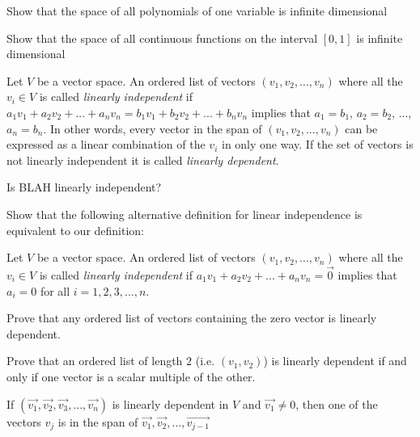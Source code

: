 \begin{Basis and Dimension}
 \begin{question}
 	Show that the space of all polynomials of one variable is infinite dimensional
 \end{question}
 
 \begin{question}
 	Show that the space of all continuous functions on the interval $[0,1]$ is infinite dimensional
 \end{question}
 
 \begin{definition}
 	Let $V$ be a vector space. An ordered list of vectors $(v_1,v_2,...,v_n)$ where all the $v_i \in V$ is called \textit{linearly independent} if
 	$a_1v_1+a_2v_2 + ...+a_nv_n = b_1v_1 + b_2v_2 + ... + b_nv_n$ implies that $a_1  = b_1$, $a_2 = b_2$, ...,$a_n=b_n$.  In other words,
 	every vector in the span of $(v_1,v_2,...,v_n)$ can be expressed as a linear combination of the $v_i$ in only one way.  
 	If the set of vectors is not linearly independent it is called \textit{linearly dependent}.
 \end{definition}
 
 \begin{question}
 	Is BLAH linearly independent?
 \end{question}
 
 \begin{question}
 	Show that the following alternative definition for linear independence is equivalent to our definition:
 	
 	\begin{definition}
 		Let $V$ be a vector space. An ordered list of vectors $(v_1,v_2,...,v_n)$ where all the $v_i \in V$ is called \textit{linearly independent} if
 	$a_1v_1+a_2v_2 + ...+a_nv_n = \vec{0}$ implies that $a_i = 0 $ for all $i=1,2,3,...,n$.
 	\end{definition}
 \end{question}
 
 \begin{question}
 	Prove that any ordered list of vectors containing the zero vector is linearly dependent. 
 \end{question}
 
 \begin{question}
 	Prove that an ordered list of length $2$ (i.e. $(v_1,v_2)$) is linearly dependent if and only if one vector is a scalar multiple of the other.
 \end{question}

 \begin{theorem}
 	If $(\vec{v_1},\vec{v_2},\vec{v_3}, ..., \vec{v_n})$ is linearly dependent in $V$ and $\vec{v_1} \neq 0$, then one of the vectors $v_j$ is in the 
 	span of $\vec{v_1},\vec{v_2},...,\vec{v_{j-1}}$
 \end{theorem}
 

\end{Basis and Dimension}
